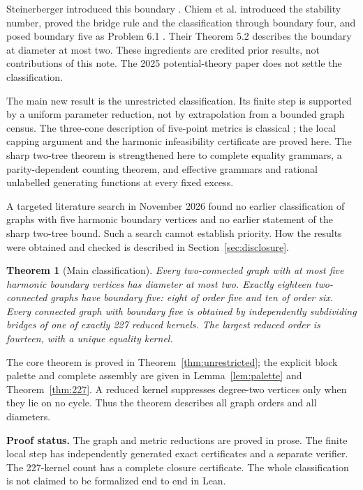 \documentclass[11pt,a4paper]{article}
\newtheorem{theorem}{Theorem}[section]
\theoremstyle{definition}\newtheorem{definition}[theorem]{Definition}
\theoremstyle{remark}\newtheorem{remark}[theorem]{Remark}
\begin{document}
Steinerberger introduced this boundary \cite{steinerberger2022}.
Chiem et al. introduced the stability number, proved the bridge rule and the
classification through boundary four, and posed boundary five as Problem 6.1
\cite{chiem}. Their Theorem 5.2 describes the boundary at diameter at most two.
These ingredients are credited prior results, not contributions of this note.
The 2025 potential-theory paper \cite{steinerberger2025} does not settle the
classification.

The main new result is the unrestricted classification. Its finite step is
supported by a uniform parameter reduction, not by extrapolation from a
bounded graph census. The three-cone description of five-point metrics is
classical \cite{koolen,celik}; the local capping argument and the harmonic
infeasibility certificate are proved here. The sharp two-tree theorem is strengthened here to complete equality grammars,
a parity-dependent counting theorem, and effective grammars and rational
unlabelled generating functions at every fixed excess.

A targeted literature search in November 2026 found no earlier
classification of graphs with five harmonic boundary vertices and no earlier
statement of the sharp two-tree bound. Such a search cannot establish
priority. How the results were obtained and checked is described in
Section~\ref{sec:disclosure}.

\begin{theorem}[Main classification]\label{thm:main}
Every two-connected graph with at most five harmonic boundary vertices
has diameter at most two. Exactly eighteen two-connected graphs have
boundary five: eight of order five and ten of order six.
Every connected graph with boundary five is obtained by independently
subdividing bridges of one of exactly 227 reduced kernels.
The largest reduced order is fourteen, with a unique equality kernel.
\end{theorem}
The core theorem is proved in Theorem~\ref{thm:unrestricted}; the explicit
block palette and complete assembly are given in Lemma~\ref{lem:palette}
and Theorem~\ref{thm:227}. A reduced kernel suppresses degree-two vertices
only when they lie on no cycle. Thus the theorem describes all graph
orders and all diameters.

\textbf{Proof status.} The graph and metric reductions are proved in prose.
The finite local step has independently generated exact certificates and a
separate verifier. The 227-kernel count has a complete closure certificate.
The whole classification is not claimed to be formalized end to end in Lean.
\end{document}
